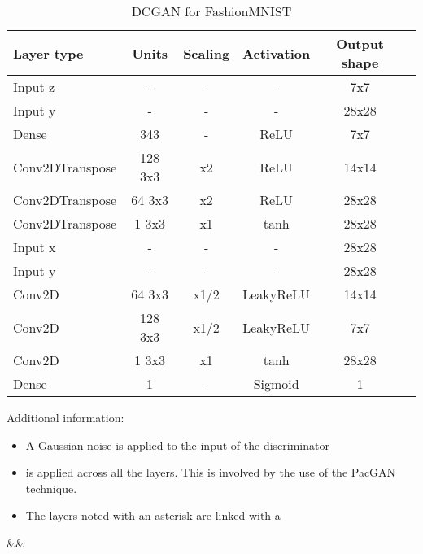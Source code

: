 \begin{table*}[h]
	\centering
	\begin{tabular}{|l|c|c|c|c|c|}
		\hline
		Layer type & Units & Scaling & Activation & Output shape\\
		\hline
		Input z & - & - & - & 7x7\\
		Input y & - & - & - & 28x28\\
		Dense & 343 & - & ReLU & 7x7\\
		Conv2DTranspose & 128 3x3 & x2 & ReLU & 14x14 \\
		Conv2DTranspose & 64 3x3 & x2 & ReLU & 28x28 \\
		Conv2DTranspose & 1 3x3 & x1 & tanh & 28x28 \\
		\hline
		Input x & - & - & - & 28x28\\
		Input y & - & - & - & 28x28\\
		Conv2D & 64 3x3 & x1/2 & LeakyReLU & 14x14 \\
		Conv2D & 128 3x3 & x1/2 & LeakyReLU & 7x7 \\
		Conv2D & 1 3x3 & x1 & tanh & 28x28 \\
		Dense & 1 & - & Sigmoid & 1\\
		\hline
	\end{tabular}
	\caption{DCGAN for FashionMNIST}
\end{table*}

Additional information: \begin{itemize}
	\item A Gaussian noise is applied to the input of the discriminator
	\item {} \citep{Ulyanov2016} is applied across all the layers. This is involved by the use of the PacGAN technique.
	\item The layers noted with an asterisk are linked with a 
\end{itemize}
&&


